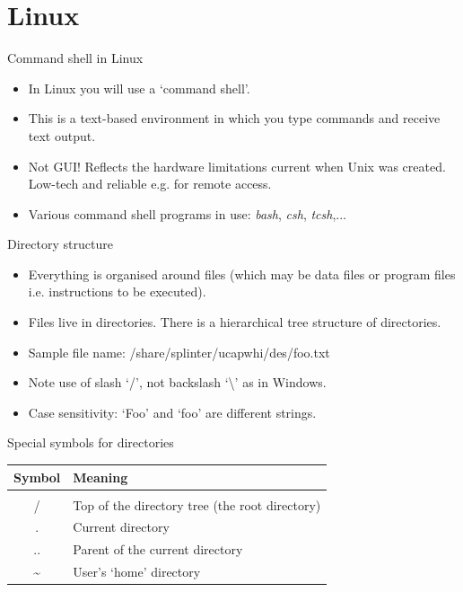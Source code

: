 \documentclass{beamer}
\begin{document}
\section{Linux}

\begin{frame}{Command shell in Linux}
  \begin{itemize}
    \item{In Linux you will use a `command shell'.}
    \item{This is a text-based environment in which you type commands and receive text output.}
    \item{Not GUI! Reflects the hardware limitations current when Unix was created. Low-tech and reliable e.g. for remote access.}
    \item{Various command shell programs in use: \textit{bash}, \textit{csh}, \textit{tcsh},...}
   \end{itemize}
\end{frame}

\begin{frame}{Directory structure}
  \begin{itemize}
    \item{Everything is organised around files (which may be data files or program files i.e. instructions to be executed).}
    \item{Files live in directories. There is a hierarchical tree structure of directories.}
    \item{Sample file name: /share/splinter/ucapwhi/des/foo.txt}
    \item{Note use of slash `/', not backslash `\textbackslash' as in Windows.}
    \item{Case sensitivity: `Foo' and `foo' are different strings.}
  \end{itemize}
\end{frame}

\begin{frame}{Special symbols for directories}
  \begin{table}[ht]
    \centering
    \begin{tabular}{c l}
      \\ [-2ex]
      Symbol & Meaning \\ [.5ex]
      \hline \\ [-2ex]
      / & Top of the directory tree (the root directory) \\
      . & Current directory \\
      .. & Parent of the current directory \\
      \textasciitilde & User's `home' directory
    \end{tabular}
  \end{table}
\end{frame}
\end{document}
